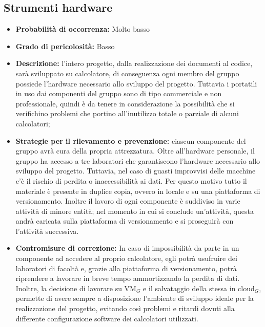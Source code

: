 \subsection{Strumenti hardware}
\begin{itemize}
\item \textbf{Probabilità di occorrenza:} Molto basso
\item \textbf{Grado di pericolosità:} Basso
\item \textbf{Descrizione:} l'intero progetto, dalla realizzazione dei documenti al codice, sarà sviluppato su calcolatore, di conseguenza ogni membro del gruppo possiede l'hardware necessario allo sviluppo del progetto. Tuttavia i portatili in uso dai componenti del gruppo sono di tipo commerciale e non professionale, quindi è da tenere in considerazione la possibilità che si verifichino problemi che portino all'inutilizzo totale o parziale di alcuni calcolatori;
\item \textbf{Strategie per il rilevamento e prevenzione:} ciascun componente del gruppo avrà cura della propria attrezzatura. Oltre all'hardware personale, il gruppo ha accesso a tre laboratori che garantiscono l'hardware necessario allo sviluppo del progetto. Tuttavia, nel caso di guasti improvvisi delle macchine c'è il rischio di perdita o inaccessibilità ai dati. Per questo motivo tutto il materiale è presente in duplice copia, ovvero in locale e su una piattaforma di versionamento. Inoltre il lavoro di ogni componente è suddiviso in varie attività di minore entità; nel momento in cui si conclude un'attività, questa andrà caricata sulla piattaforma di versionamento e si proseguirà con l'attività successiva. 
\item \textbf{Contromisure di correzione:} In caso di impossibilità da parte in un componente ad accedere al proprio calcolatore, egli potrà usufruire dei laboratori di facoltà e, grazie alla piattaforma di versionamento, potrà riprendere a lavorare in breve tempo ammortizzando la perdita di dati. Inoltre, la decisione di lavorare su VM$_G$ e il salvataggio della stessa in cloud$_G$, permette di avere sempre a disposizione l'ambiente di sviluppo ideale per la realizzazione del progetto, evitando così problemi e ritardi dovuti alla differente configurazione software dei calcolatori utilizzati.
\end{itemize}

